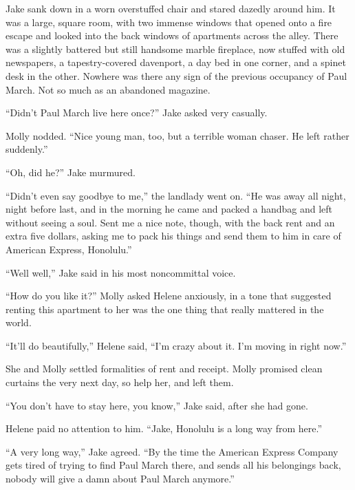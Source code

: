 \documentclass{novel}
\begin{document}
\begin{ChapterStart}
\vspace{3\nbs}
\end{ChapterStart}

Jake sank down in a worn overstuffed chair and stared dazedly around him. It was a large, square room, with two immense windows that opened onto a fire escape and looked into the back windows of apartments across the alley. There was a slightly battered but still handsome marble fireplace, now stuffed with old newspapers, a tapestry-covered davenport, a day bed in one corner, and a spinet desk in the other. Nowhere was there any sign of the previous occupancy of Paul March. Not so much as an abandoned magazine.

“Didn’t Paul March live here once?” Jake asked very casually.

Molly nodded. “Nice young man, too, but a terrible woman chaser. He left rather suddenly.”

“Oh, did he?” Jake murmured.

“Didn’t even say goodbye to me,” the landlady went on. “He was away all night, night before last, and in the morning he came and packed a handbag and left without seeing a soul. Sent me a nice note, though, with the back rent and an extra five dollars, asking me to pack his things and send them to him in care of American Express, Honolulu.”

“Well well,” Jake said in his most noncommittal voice.

“How do you like it?” Molly asked Helene anxiously, in a tone that suggested renting this apartment to her was the one thing that really mattered in the world.

“It’ll do beautifully,” Helene said, “I’m crazy about it. I’m moving in right now.”

She and Molly settled formalities of rent and receipt. Molly promised clean curtains the very next day, so help her, and left them.

“You don’t have to stay here, you know,” Jake said, after she had gone.

Helene paid no attention to him. “Jake, Honolulu is a long way from here.”

“A very long way,” Jake agreed. “By the time the American Express Company gets tired of trying to find Paul March there, and sends all his belongings back, nobody will give a damn about Paul March anymore.”
\end{document}
